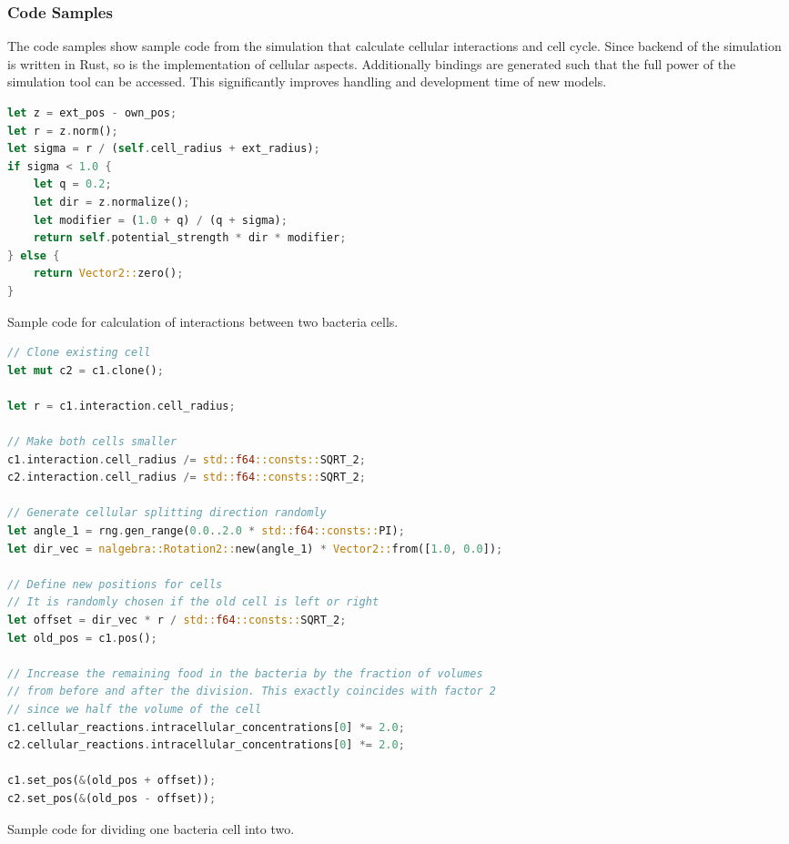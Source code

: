 \documentclass[10pt,twocolumn,5p]{elsarticle}
\numberwithin{equation}{section}
\begin{document}
\subsubsection{Code Samples}
The code samples show sample code from the simulation that calculate cellular interactions and cell cycle.
Since backend of the simulation is written in Rust, so is the implementation of cellular aspects.
Additionally bindings are generated such that the full power of the simulation tool can be accessed.
This significantly improves handling and development time of new models.
\begin{listing}
\begin{lstlisting}[language=rust]
let z = ext_pos - own_pos;
let r = z.norm();
let sigma = r / (self.cell_radius + ext_radius);
if sigma < 1.0 {
    let q = 0.2;
    let dir = z.normalize();
    let modifier = (1.0 + q) / (q + sigma);
    return self.potential_strength * dir * modifier;
} else {
    return Vector2::zero();
}
\end{lstlisting}
\caption{
    Sample code for calculation of interactions between two bacteria cells.
}
\label{listing:spatial-interaction-strength}
\end{listing}
%
%
\begin{listing}
\begin{lstlisting}[language=rust]
// Clone existing cell
let mut c2 = c1.clone();

let r = c1.interaction.cell_radius;

// Make both cells smaller
c1.interaction.cell_radius /= std::f64::consts::SQRT_2;
c2.interaction.cell_radius /= std::f64::consts::SQRT_2;

// Generate cellular splitting direction randomly
let angle_1 = rng.gen_range(0.0..2.0 * std::f64::consts::PI);
let dir_vec = nalgebra::Rotation2::new(angle_1) * Vector2::from([1.0, 0.0]);

// Define new positions for cells
// It is randomly chosen if the old cell is left or right
let offset = dir_vec * r / std::f64::consts::SQRT_2;
let old_pos = c1.pos();

// Increase the remaining food in the bacteria by the fraction of volumes
// from before and after the division. This exactly coincides with factor 2
// since we half the volume of the cell
c1.cellular_reactions.intracellular_concentrations[0] *= 2.0;
c2.cellular_reactions.intracellular_concentrations[0] *= 2.0;

c1.set_pos(&(old_pos + offset));
c2.set_pos(&(old_pos - offset));
\end{lstlisting}
\caption{
    Sample code for dividing one bacteria cell into two.
}
\end{listing}
%
%
\end{document}
